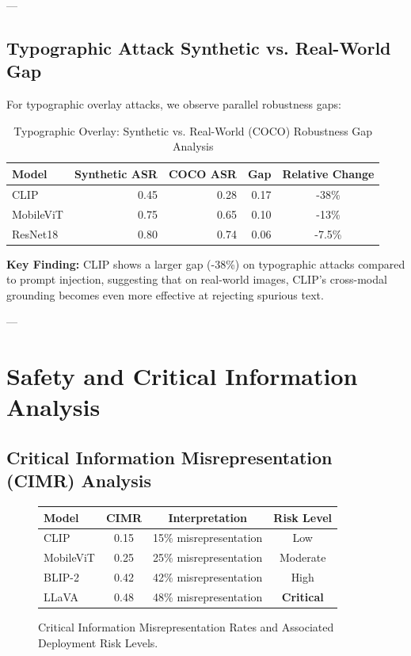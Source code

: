 \documentclass[11pt]{article}
\begin{document}
---

\subsection{Typographic Attack Synthetic vs. Real-World Gap}

For typographic overlay attacks, we observe parallel robustness gaps:

\begin{table}[H]
\centering
\small
\caption{Typographic Overlay: Synthetic vs. Real-World (COCO) Robustness Gap Analysis}
\label{tab:typographic_gap}
\begin{tabular}{|l|r|r|r|c|}
\hline
\textbf{Model} & \textbf{Synthetic ASR} & \textbf{COCO ASR} & \textbf{Gap} & \textbf{Relative Change} \\
\hline
CLIP & 0.45 & 0.28 & 0.17 & -38\% \\
\hline
MobileViT & 0.75 & 0.65 & 0.10 & -13\% \\
\hline
ResNet18 & 0.80 & 0.74 & 0.06 & -7.5\% \\
\hline
\end{tabular}
\end{table}

\textbf{Key Finding:} CLIP shows a larger gap (-38\%) on typographic attacks compared to prompt injection, suggesting that on real-world images, CLIP's cross-modal grounding becomes even more effective at rejecting spurious text.

---

\section{Safety and Critical Information Analysis}

\subsection{Critical Information Misrepresentation (CIMR) Analysis}

\begin{figure}[H]
\centering
\begin{tabular}{l|c|c|c}
\textbf{Model} & \textbf{CIMR} & \textbf{Interpretation} & \textbf{Risk Level} \\
\hline
CLIP & 0.15 & 15\% misrepresentation & Low \\
MobileViT & 0.25 & 25\% misrepresentation & Moderate \\
BLIP-2 & 0.42 & 42\% misrepresentation & High \\
LLaVA & 0.48 & 48\% misrepresentation & \textbf{Critical} \\
\end{tabular}
\caption*{Critical Information Misrepresentation Rates and Associated Deployment Risk Levels.}
\end{figure}
\end{document}
